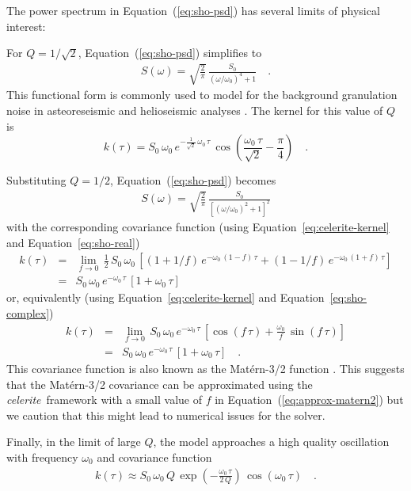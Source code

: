 \documentclass[manuscript, letterpaper]{aastex6}
\newcommand{\celeriteterm}{\emph{celerite}}
\renewcommand{\eqref}[1]{\ref{eq:#1}}
\newcommand{\Eq}[1]{Equation~(\eqref{#1})}
\newcommand{\eq}[1]{\Eq{#1}}
\newcommand{\eqalt}[1]{Equation~\eqref{#1}}
\newcommand{\eqlabel}[1]{\label{eq:#1}}
\begin{document}
The power spectrum in \eq{sho-psd} has several limits of physical interest:
\begin{itemize}

{\item For $Q = 1/\sqrt{2}$, \eq{sho-psd} simplifies to
\begin{eqnarray}\eqlabel{granulation-psd}
S(\omega) = \sqrt{\frac{2}{\pi}}\,\frac{S_0}{(\omega/\omega_0)^4+1} \quad.
\end{eqnarray}
This functional form is commonly used to model for the background granulation
noise in asteoreseismic and helioseismic analyses \citep{Harvey:1985, Michel:2009,
Kallinger:2014}.
The kernel for this value of $Q$ is
\begin{equation}
k(\tau) = S_0\,\omega_0\,e^{-\frac{1}{\sqrt{2}}\,\omega_0\,\tau}\,
    \cos{\left(\frac{\omega_0\,\tau}{\sqrt{2}}-\frac{\pi}{4}\right)} \quad.
\end{equation}}

{\item Substituting $Q = 1/2$, \eq{sho-psd} becomes
\begin{eqnarray}
S(\omega) =
    \sqrt{\frac{2}{\pi}}\,\frac{S_0}{\left[(\omega/\omega_0)^2+1\right]^2}
\end{eqnarray}
with the corresponding covariance function (using
\eqalt{celerite-kernel} and \eqalt{sho-real})
\begin{eqnarray}\eqlabel{approx-matern}
k(\tau) &=& \lim_{f \to 0}\,
    \frac{1}{2}\,S_0\,\omega_0\,
    \left[\left(1+1/f\right)\,e^{-\omega_0\,(1-f)\,\tau} +
          \left(1-1/f\right)\,e^{-\omega_0\,(1+f)\,\tau}
    \right] \\
&=& S_0\,\omega_0\,e^{-\omega_0\,\tau}\,[1+\omega_0\,\tau]
\end{eqnarray}
or, equivalently (using \eqalt{celerite-kernel} and \eqalt{sho-complex})
\begin{eqnarray}\eqlabel{approx-matern2}
k(\tau) &=& \lim_{f \to 0}\,
    S_0\,\omega_0\,e^{-\omega_0\,\tau}\,
    \left[\cos(f\,\tau) + \frac{\omega_0}{f}\,\sin(f\,\tau)\right] \\
&=& S_0\,\omega_0\,e^{-\omega_0\,\tau}\,[1+\omega_0\,\tau] \quad.
\end{eqnarray}
This covariance function is also known as the Mat\'ern-3/2 function
\citep{Rasmussen:2006}.
This suggests that the Mat\'ern-3/2 covariance can be approximated using
the \celeriteterm\ framework with a small value of $f$ in \eq{approx-matern2} but we
caution that this might lead to numerical issues for the solver.
}

{\item Finally, in the limit of large $Q$, the model approaches a high
    quality oscillation with frequency $\omega_0$ and covariance function
\begin{eqnarray}
k(\tau) \approx
    S_0\,\omega_0\,Q\,
    \exp\left(-\frac{\omega_0\,\tau}{2\,Q}\right)\,
    \cos\left(\omega_0\,\tau\right) \quad.
\end{eqnarray}}

\end{itemize}
\end{document}
